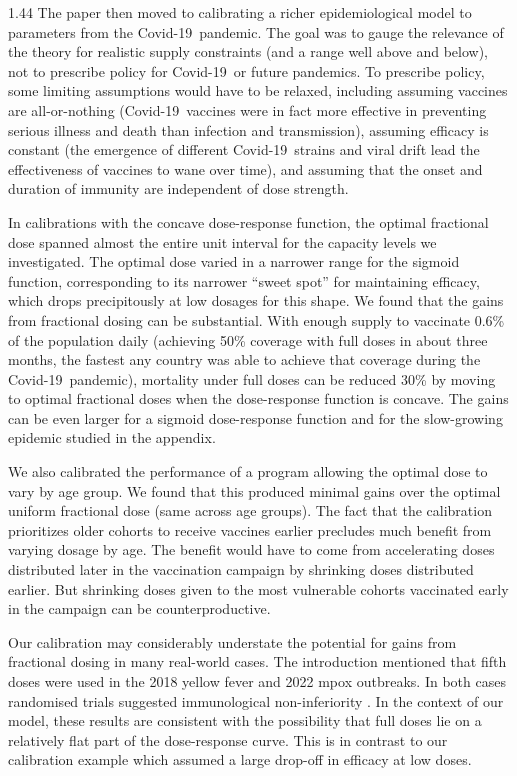 \documentclass[12pt]{article}
\newcommand{\covid}{Covid-19}
\begin{document}
\begin{spacing}{1.44}
The paper then moved to calibrating a richer epidemiological model to
parameters from the \covid\ pandemic. The goal was to gauge the
relevance of the theory for realistic supply constraints (and a range
well above and below), not to prescribe policy for \covid\ or future
pandemics. To prescribe policy, some limiting assumptions would have
to be relaxed, including assuming vaccines are all-or-nothing
(\covid\ vaccines were in fact more effective in preventing serious
illness and death than infection and transmission), assuming efficacy
is constant (the emergence of different \covid\ strains and viral
drift lead the effectiveness of vaccines to wane over time), and
assuming that the onset and duration of immunity are independent of
dose strength.

In calibrations with the concave dose-response function, the optimal
fractional dose spanned almost the entire unit interval for the
capacity levels we investigated. The optimal dose varied in a narrower
range for the sigmoid function, corresponding to its narrower ``sweet
spot'' for maintaining efficacy, which drops precipitously at low
dosages for this shape. We found that the gains from fractional dosing
can be substantial.  With enough supply to vaccinate 0.6\% of the
population daily (achieving 50\% coverage with full doses in about
three months, the fastest any country was able to achieve that
coverage during the \covid\ pandemic), mortality under full doses can
be reduced 30\% by moving to optimal fractional doses when the
dose-response function is concave. The gains can be even larger for a
sigmoid dose-response function and for the slow-growing epidemic
studied in the appendix.

We also calibrated the performance of a program allowing the optimal
dose to vary by age group.  We found that this produced minimal gains
over the optimal uniform fractional dose (same across age groups). The
fact that the calibration prioritizes older cohorts to receive
vaccines earlier precludes much benefit from varying dosage by
age. The benefit would have to come from accelerating doses
distributed later in the vaccination campaign by shrinking doses
distributed earlier. But shrinking doses given to the most vulnerable
cohorts vaccinated early in the campaign can be counterproductive.

Our calibration may considerably understate the potential for gains
from fractional dosing in many real-world cases. The introduction
mentioned that fifth doses were used in the 2018 yellow fever and 2022
mpox outbreaks. In both cases randomised trials suggested
immunological non-inferiority \citep{JuanGiner2021, CDC2026MpoxVaccine}.  
In the context of our model, these results are consistent with the 
possibility that full doses lie on a relatively flat part of the 
dose-response curve. This is in contrast to our calibration
example which assumed a large drop-off in efficacy at low doses.


\end{spacing}
\end{document}
